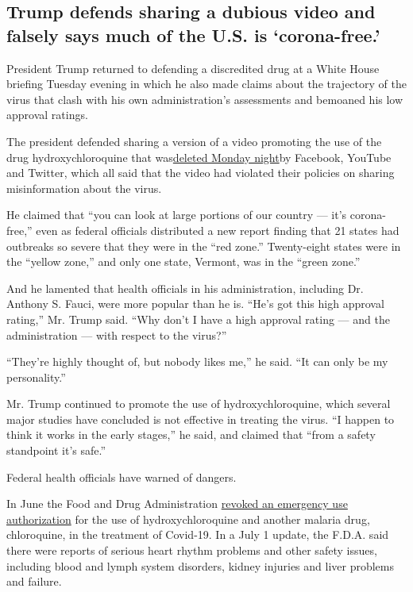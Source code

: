 \hypertarget{trump-defends-sharing-a-dubious-video-and-falsely-says-much-of-the-us-is-corona-free}{%
\subsection{Trump defends sharing a dubious video and falsely says much
of the U.S. is
`corona-free.'}\label{trump-defends-sharing-a-dubious-video-and-falsely-says-much-of-the-us-is-corona-free}}

President Trump returned to defending a discredited drug at a White
House briefing Tuesday evening in which he also made claims about the
trajectory of the virus that clash with his own administration's
assessments and bemoaned his low approval ratings.

The president defended sharing a version of a video promoting the use of
the drug hydroxychloroquine that
was\href{https://www.nytimes3xbfgragh.onion/2020/07/28/technology/virus-video-trump.html}{deleted
Monday night}by Facebook, YouTube and Twitter, which all said that the
video had violated their policies on sharing misinformation about the
virus.

He claimed that ``you can look at large portions of our country --- it's
corona-free,'' even as federal officials distributed a new report
finding that 21 states had outbreaks so severe that they were in the
``red zone.'' Twenty-eight states were in the ``yellow zone,'' and only
one state, Vermont, was in the ``green zone.''

And he lamented that health officials in his administration, including
Dr. Anthony S. Fauci, were more popular than he is. ``He's got this high
approval rating,'' Mr. Trump said. ``Why don't I have a high approval
rating --- and the administration --- with respect to the virus?''

``They're highly thought of, but nobody likes me,'' he said. ``It can
only be my personality.''

Mr. Trump continued to promote the use of hydroxychloroquine, which
several major studies have concluded is not effective in treating the
virus. ``I happen to think it works in the early stages,'' he said, and
claimed that ``from a safety standpoint it's safe.''

Federal health officials have warned of dangers.

In June the Food and Drug Administration
\href{https://www.nytimes3xbfgragh.onion/2020/06/15/health/fda-hydroxychloroquine-malaria.html}{revoked
an emergency use authorization} for the use of hydroxychloroquine and
another malaria drug, chloroquine, in the treatment of Covid-19. In a
July 1 update, the F.D.A. said there were reports of serious heart
rhythm problems and other safety issues, including blood and lymph
system disorders, kidney injuries and liver problems and failure.

